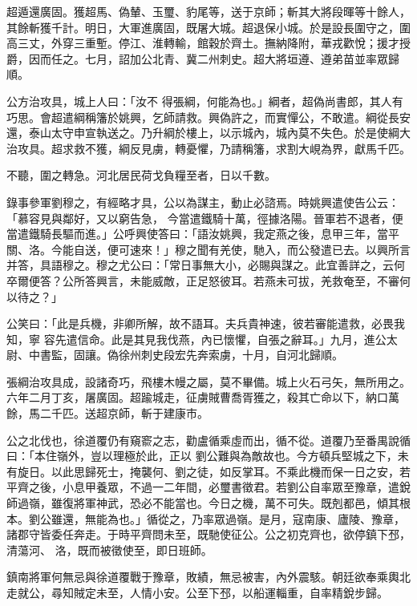 \begin{pinyinscope}
 超遁還廣固。獲超馬、偽輦、玉璽、豹尾等，送于京師；斬其大將段暉等十餘人，其餘斬獲千計。明日，大軍進廣固，既屠大城。超退保小城。於是設長圍守之，圍高三丈，外穿三重塹。停江、淮轉輸，館穀於齊土。撫納降附，華戎歡悅；援才授爵，因而任之。七月，詔加公北青、冀二州刺史。超大將垣遵、遵弟苗並率眾歸順。



 公方治攻具，城上人曰：「汝不
 得張綱，何能為也。」綱者，超偽尚書郎，其人有巧思。會超遣綱稱籓於姚興，乞師請救。興偽許之，而實憚公，不敢遣。綱從長安還，泰山太守申宣執送之。乃升綱於樓上，以示城內，城內莫不失色。於是使綱大治攻具。超求救不獲，綱反見虜，轉憂懼，乃請稱籓，求割大峴為界，獻馬千匹。



 不聽，圍之轉急。河北居民荷戈負糧至者，日以千數。



 錄事參軍劉穆之，有經略才具，公以為謀主，動止必諮焉。時姚興遣使告公云：「慕容見與鄰好，又以窮告急，
 今當遣鐵騎十萬，徑據洛陽。晉軍若不退者，便當遣鐵騎長驅而進。」公呼興使答曰：「語汝姚興，我定燕之後，息甲三年，當平關、洛。今能自送，便可速來！」穆之聞有羌使，馳入，而公發遣已去。以興所言并答，具語穆之。穆之尤公曰：「常日事無大小，必賜與謀之。此宜善詳之，云何卒爾便答？公所答興言，未能威敵，正足怒彼耳。若燕未可拔，羌救奄至，不審何以待之？」



 公笑曰：「此是兵機，非卿所解，故不語耳。夫兵貴神速，彼若審能遣救，必畏我知，寧
 容先遣信命。此是其見我伐燕，內已懷懼，自張之辭耳。」九月，進公太尉、中書監，固讓。偽徐州刺史段宏先奔索虜，十月，自河北歸順。



 張綱治攻具成，設諸奇巧，飛樓木幔之屬，莫不畢備。城上火石弓矢，無所用之。六年二月丁亥，屠廣固。超踰城走，征虜賊曹喬胥獲之，殺其亡命以下，納口萬餘，馬二千匹。送超京師，斬于建康市。



 公之北伐也，徐道覆仍有窺窬之志，勸盧循乘虛而出，循不從。道覆乃至番禺說循曰：「本住嶺外，豈以理極於此，正以
 劉公難與為敵故也。今方頓兵堅城之下，未有旋日。以此思歸死士，掩襲何、劉之徒，如反掌耳。不乘此機而保一日之安，若平齊之後，小息甲養眾，不過一二年間，必璽書徵君。若劉公自率眾至豫章，遣銳師過嶺，雖復將軍神武，恐必不能當也。今日之機，萬不可失。既剋都邑，傾其根本。劉公雖還，無能為也。」循從之，乃率眾過嶺。是月，寇南康、廬陵、豫章，諸郡守皆委任奔走。于時平齊問未至，既馳使征公。公之初克齊也，欲停鎮下邳，清蕩河、
 洛，既而被徵使至，即日班師。



 鎮南將軍何無忌與徐道覆戰于豫章，敗績，無忌被害，內外震駭。朝廷欲奉乘輿北走就公，尋知賊定未至，人情小安。公至下邳，以船運輜重，自率精銳步歸。




\end{pinyinscope}
